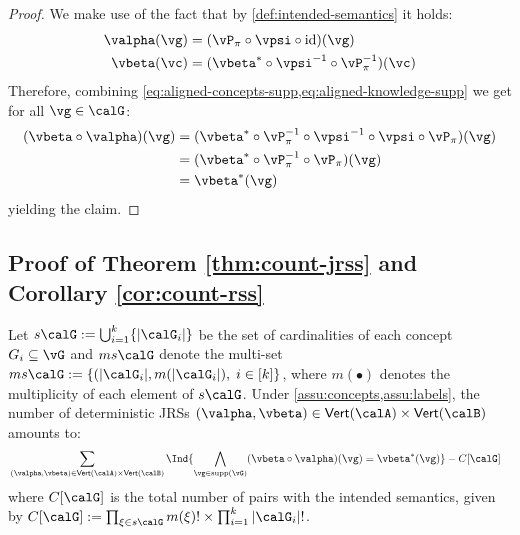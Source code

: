 \begin{proof}
    We make use of the fact that by \cref{def:intended-semantics} it holds:
    \begin{align}
        \valpha(\vg) &=
            (\vP_\pi \circ \vpsi  \circ \mathrm{id})(\vg)%
        \label{eq:aligned-concepts-supp}
        \\
        \vbeta(\vc) &= 
            (\vbeta^* \circ 
            \vpsi^{-1} \circ \vP_\pi^{-1} ) (\vc)
        \label{eq:aligned-knowledge-supp}
    \end{align}
    Therefore, combining \cref{eq:aligned-concepts-supp,eq:aligned-knowledge-supp} we get for all $\vg \in \calG$:
    \begin{align}
        (\vbeta \circ \valpha)(\vg) 
            &= (\vbeta^* \circ
            \vP_\pi^{-1} \circ \vpsi^{-1} \circ 
            \vpsi \circ \vP_\pi)(\vg) \\
            &= (\vbeta^* \circ
            \vP_\pi^{-1} \circ \vP_\pi)(\vg) \\
            &= \vbeta^* (\vg)
    \end{align}
    yielding the claim.
\end{proof}





\subsection{Proof of Theorem \ref{thm:count-jrss} and Corollary \ref{cor:count-rss}}



\begin{theorem}
    Let $s\calG := \bigcup_{i=1}^k \{|\calG_i|\}$ be the set of cardinalities of each concept $G_i \subseteq \vG$ and $ms\calG$ denote the multi-set 
    $ms\calG := \{ (|\calG_i|, m(|\calG_i|), \; i \in [k] \} $, where $m(\bullet)$ denotes the multiplicity of each element of $s\calG$. 
    Under \cref{assu:concepts,assu:labels}, the number of deterministic JRSs $(\valpha, \vbeta) \in \Vset{\calA} \times \Vset{\calB}$ amounts to:
    \begin{align}
        \textstyle
        &
        \sum_{(\valpha, \vbeta) \in \Vset{\calA} \times \Vset{\calB}} 
        \Ind{
             \bigwedge_{\vg \in \supp(\vG)}
            (\vbeta \circ \valpha)(\vg)
                =
                \vbeta^* (\vg)
        } - C[\calG]
        \label{eq:jrs-count-app}
    \end{align}  
    where $C[\calG]$ is the total number of pairs with the intended semantics, given by
    $
        C[\calG] := \prod_{\xi \in s\calG} m(\xi)! \times \prod_{i=1}^k |\calG_i|!
    $.
    
\end{theorem}

